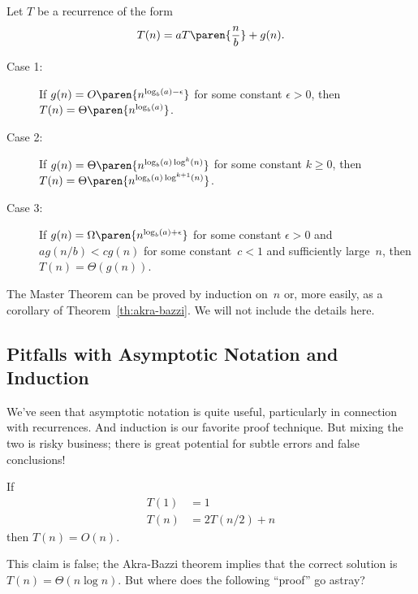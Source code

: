 \begin{theorem}\label{thm:master_theorem}
Let $T$ be a recurrence of the form
\begin{equation*}
    T(n) = a T\paren{\frac{n}{b}} + g(n).
\end{equation*}
\begin{description}

\item[Case 1:]
If $g(n) = O\paren{n^{\log_b(a) - \epsilon}}$ for some constant
$\epsilon > 0$, then $T(n) = \Theta\paren{n^{\log_b(a)}}$.

\item[Case 2:]
If $g(n) = \Theta\paren{n^{\log_b(a) \log^k(n)}}$ for some constant
$k \ge 0$, then $T(n) = \Theta\paren{n^{\log_b(a) \log^{k + 1}(n)}}$.

\item[Case 3:]

If $g(n) = \Omega\paren{n^{\log_b(a) + \epsilon}}$ for some constant
$\epsilon > 0$ and $a g(n/b) < c g(n)$ for some constant~$c < 1$ and
sufficiently large~$n$, then $T(n) = \Theta(g(n))$.

\end{description}
\end{theorem}

The Master Theorem can be proved by induction on~$n$ or, more easily,
as a corollary of Theorem~\ref{th:akra-bazzi}.  We will not include
the details here.

\subsection{Pitfalls with Asymptotic Notation and Induction}

We've seen that asymptotic notation is quite useful, particularly in
connection with recurrences.  And induction is our favorite proof
technique.  But mixing the two  is risky business; there is great
potential for subtle errors and false conclusions!

\begin{falseclm*}
If
\begin{align*}
    T(1)    &= 1 \\
    T(n)    &= 2 T(n/2) + n
\end{align*}
then $T(n) = O(n)$.
\end{falseclm*}

This claim is false; the Akra-Bazzi theorem implies that the correct
solution is $T(n) = \Theta(n \log n)$.  But where does the following
``proof'' go astray?

